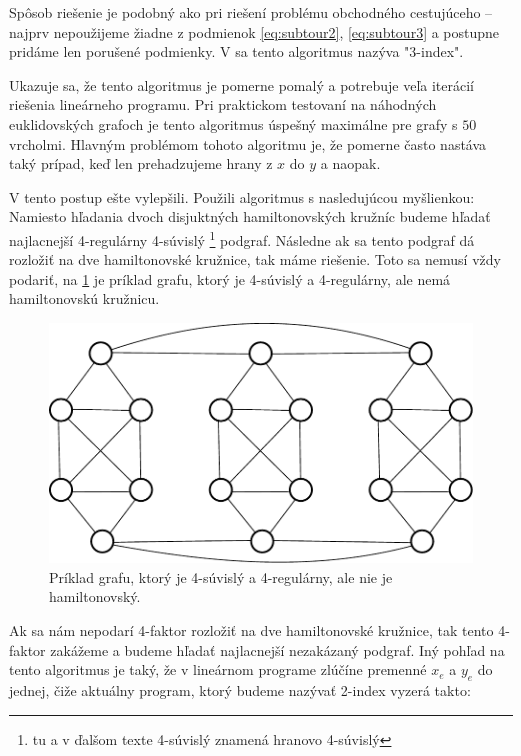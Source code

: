 Spôsob riešenie je podobný ako pri riešení problému obchodného cestujúceho -- najprv
nepoužijeme žiadne z podmienok \eqref{eq:subtour2}, \eqref{eq:subtour3} a postupne
pridáme len porušené podmienky. V \cite{duchenne} sa tento algoritmus nazýva "3-index".

Ukazuje sa, že tento algoritmus je pomerne pomalý a potrebuje veľa iterácií riešenia
lineárneho programu. Pri praktickom testovaní na náhodných euklidovských grafoch
je tento algoritmus úspešný maximálne pre grafy s $50$ vrcholmi. Hlavným problémom
tohoto algoritmu je, že pomerne často nastáva taký prípad, keď len prehadzujeme hrany z $x$ 
do $y$ a naopak. 

\smallskip

V \cite{duchenne} tento postup ešte vylepšili. Použili algoritmus s nasledujúcou myšlienkou:
Namiesto hľadania dvoch
disjuktných hamiltonovských kružníc budeme hľadať najlacnejší 4-regulárny 4-súvislý
\footnote{tu a v ďalšom texte 4-súvislý znamená hranovo 4-súvislý} podgraf.
Následne ak sa tento podgraf dá rozložiť na dve hamiltonovské kružnice, tak máme riešenie.
Toto sa nemusí vždy podariť, na \ref{fig:bad} je príklad grafu, ktorý je 4-súvislý a 4-regulárny,
ale nemá hamiltonovskú kružnicu. 

\begin{figure}[h]
\centering
\includegraphics[scale=0.5]{img/bad4.pdf}
\caption{Príklad grafu, ktorý je 4-súvislý a 4-regulárny, ale nie je hamiltonovský.}
\label{fig:bad}
\end{figure}

Ak sa nám nepodarí 4-faktor rozložiť na dve hamiltonovské kružnice, tak tento 4-faktor zakážeme
a budeme hľadať najlacnejší nezakázaný podgraf.
Iný pohľad na tento algoritmus je taký, že v lineárnom programe zlúčíne premenné $x_e$ a $y_e$ 
do jednej, čiže aktuálny program, ktorý budeme nazývať 2-index vyzerá takto:

